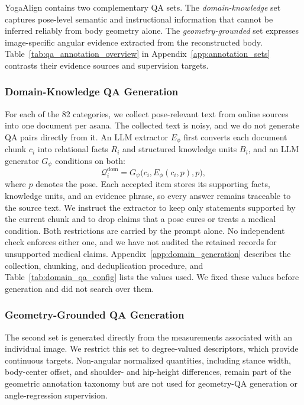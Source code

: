 YogaAlign contains two complementary QA sets.
The \emph{domain-knowledge} set captures pose-level semantic and instructional information that cannot be inferred reliably from body geometry alone.
The \emph{geometry-grounded} set expresses image-specific angular evidence extracted from the reconstructed body.
Table~\ref{tab:qa_annotation_overview} in Appendix~\ref{app:annotation_sets} contrasts their evidence sources and supervision targets.


\subsubsection{Domain-Knowledge QA Generation}
\label{subsubsec:domain_qa_generation}

For each of the 82 categories, we collect pose-relevant text from online sources into one document per asana.
The collected text is noisy, and we do not generate QA pairs directly from it.
An LLM extractor $E_{\phi}$ first converts each document chunk $c_i$ into relational facts $R_i$ and structured knowledge units $B_i$, and an LLM generator $G_{\psi}$ conditions on both:
\begin{equation}
\mathcal{Q}^{\mathrm{dom}}_i=G_{\psi}\bigl(c_i,E_{\phi}(c_i,p),p\bigr),
\label{eq:domain_qa}
\end{equation}
where $p$ denotes the pose.
Each accepted item stores its supporting facts, knowledge units, and an evidence phrase, so every answer remains traceable to the source text.
We instruct the extractor to keep only statements supported by the current chunk and to drop claims that a pose cures or treats a medical condition.
Both restrictions are carried by the prompt alone.
No independent check enforces either one, and we have not audited the retained records for unsupported medical claims.
Appendix~\ref{app:domain_generation} describes the collection, chunking, and deduplication procedure, and Table~\ref{tab:domain_qa_config} lists the values used.
We fixed these values before generation and did not search over them.

\subsubsection{Geometry-Grounded QA Generation}
\label{subsubsec:geometry_qa_generation}

The second set is generated directly from the measurements associated with an individual image.
We restrict this set to degree-valued descriptors, which provide continuous targets.
Non-angular normalized quantities, including stance width, body-center offset, and shoulder- and hip-height differences, remain part of the geometric annotation taxonomy but are not used for geometry-QA generation or angle-regression supervision.

